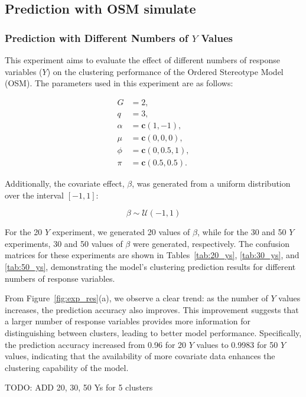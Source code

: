 \documentclass{article}
\begin{document}
\subsection{Prediction with OSM simulate}

\subsubsection*{Prediction with Different Numbers of \( Y \) Values}

This experiment aims to evaluate the effect of different numbers of response variables (\( Y \)) on the clustering performance of the Ordered Stereotype Model (OSM). The parameters used in this experiment are as follows:

\[
\begin{aligned}
G &= 2, \\
q &= 3, \\
\alpha &= \mathbf{c}(1, -1), \\
\mu &= \mathbf{c}(0, 0, 0), \\
\phi &= \mathbf{c}(0, 0.5, 1), \\
\pi &= \mathbf{c}(0.5, 0.5).
\end{aligned}
\]

Additionally, the covariate effect, \(\beta\), was generated from a uniform distribution over the interval \([-1, 1]\):

\[
\beta \sim \mathcal{U}(-1, 1)
\]

For the 20 \( Y \) experiment, we generated 20 values of \(\beta\), while for the 30 and 50 \( Y \) experiments, 30 and 50 values of \(\beta\) were generated, respectively. 
The confusion matrices for these experiments are shown in Tables~\ref{tab:20_ys}, \ref{tab:30_ys}, and \ref{tab:50_ys}, demonstrating the model's clustering prediction results for different numbers of response variables.

From Figure~\ref{fig:exp_res}(a), we observe a clear trend: as the number of \( Y \) values increases, the prediction accuracy also improves. 
This improvement suggests that a larger number of response variables provides more information for distinguishing between clusters, leading to better model performance. 
Specifically, the prediction accuracy increased from 0.96 for 20 \( Y \) values to 0.9983 for 50 \( Y \) values, indicating that the availability of more covariate data enhances the clustering capability of the model.

TODO: ADD 20, 30, 50 Ys for 5 clusters
\end{document}
